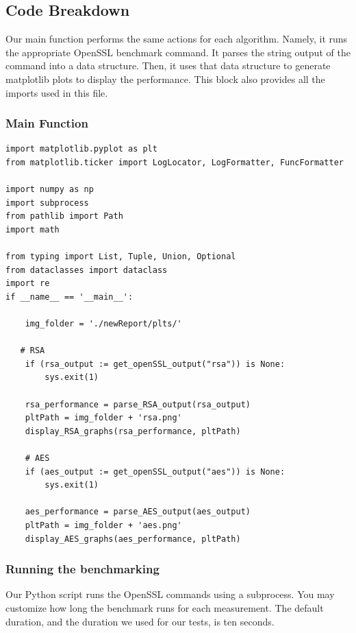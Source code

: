 \documentclass[11pt]{article}
\begin{document}
\subsection*{Code Breakdown}
Our main function performs the same actions for each algorithm. Namely, it runs the appropriate OpenSSL benchmark command. It parses the string output of the command into a data structure. Then, it uses that data structure to generate matplotlib plots to display the performance. This block also provides all the imports used in this file.

\subsubsection*{Main Function}

\begin{lstlisting}
import matplotlib.pyplot as plt
from matplotlib.ticker import LogLocator, LogFormatter, FuncFormatter

import numpy as np
import subprocess
from pathlib import Path
import math

from typing import List, Tuple, Union, Optional
from dataclasses import dataclass
import re
if __name__ == '__main__':
    
    img_folder = './newReport/plts/'

   # RSA
    if (rsa_output := get_openSSL_output("rsa")) is None:
        sys.exit(1)

    rsa_performance = parse_RSA_output(rsa_output)
    pltPath = img_folder + 'rsa.png'
    display_RSA_graphs(rsa_performance, pltPath)

    # AES
    if (aes_output := get_openSSL_output("aes")) is None:
        sys.exit(1)

    aes_performance = parse_AES_output(aes_output)
    pltPath = img_folder + 'aes.png'
    display_AES_graphs(aes_performance, pltPath) 
\end{lstlisting}

\subsubsection*{Running the benchmarking}

Our Python script runs the OpenSSL commands using a subprocess. You may customize how long the benchmark runs for each measurement. The default duration, and the duration we used for our tests, is ten seconds.
\end{document}
